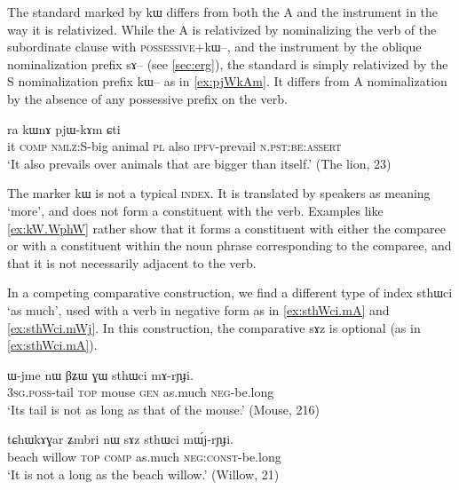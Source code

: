 \documentclass[oldfontcommands,oneside,a4paper,11pt]{article}
\newcommand{\ipa}[1]{{\phon #1}} %
\begin{document}
The standard marked by \ipa{kɯ} differs from both the A and the instrument in the way it is relativized. While the A is relativized by  nominalizing the verb of the subordinate clause with  \textsc{possessive}+\ipa{kɯ--}, and the instrument by the oblique nominalization prefix \ipa{sɤ--} (see \ref{sec:erg}), the standard is simply relativized by the S nominalization prefix  \ipa{kɯ--} as in   \ref{ex:pjWkAm}. It differs from A nominalization by  the absence of any possessive prefix on the verb.

 
 
\begin{exe}
\ex \label{ex:pjWkAm}
\gll
[\ipa{ɯʑo}  	\ipa{sɤz}  	\ipa{kɯ-wxti}]  	\ipa{rɯdaʁ}  	\ipa{ra}  	\ipa{kɯnɤ}  	\ipa{pjɯ-kɤm}  	\ipa{ɕti}  \\
it \textsc{comp} \textsc{nmlz}:S-big animal \textsc{pl} also \textsc{ipfv}-prevail \textsc{n.pst:be}:\textsc{assert} \\
\glt `It also prevails over animals that are bigger than itself.' (The lion, 23)
  \end{exe}


 
The marker   \ipa{kɯ} is not a typical  \textsc{index}. It is translated by speakers as meaning `more', and does not form a constituent with the verb. Examples like \ref{ex:kW.WphW} rather show that it forms a constituent with either the comparee or with a constituent within the noun phrase corresponding to the comparee, and that it is not necessarily adjacent to the verb.

In a competing comparative construction, we find a different type of index   \ipa{sthɯci} `as much', used with a verb in negative form as in \ref{ex:sthWci.mA} and \ref{ex:sthWci.mWj}. In this construction, the comparative \ipa{sɤz} is optional (as in \ref{ex:sthWci.mA}).
 
 
 \begin{exe}
\ex \label{ex:sthWci.mA}
\gll 
\ipa{ɯ-jme}  	\ipa{nɯ}  	\ipa{βʑɯ}  	\ipa{ɣɯ}  	\ipa{sthɯci}  	\ipa{mɤ-rɲɟi.}  \\
\textsc{3sg.poss}-tail \textsc{top} mouse \textsc{gen} as.much \textsc{neg}-be.long \\
\glt `Its tail is not as long as that of the mouse.'  (Mouse, 216)
 \end{exe}
 
  \begin{exe}
\ex \label{ex:sthWci.mWj}
\gll 
 \ipa{tɕhɯkɤɣar}  	\ipa{ʑmbri}  	\ipa{nɯ}  	\ipa{sɤz}  	\ipa{sthɯci}  	\ipa{mɯ́j-rɲɟi.}  \\
beach willow \textsc{top} \textsc{comp} as.much \textsc{neg:const}-be.long \\
\glt `It is not a long as the beach willow.' (Willow, 21)
  \end{exe}
  
\end{document}
